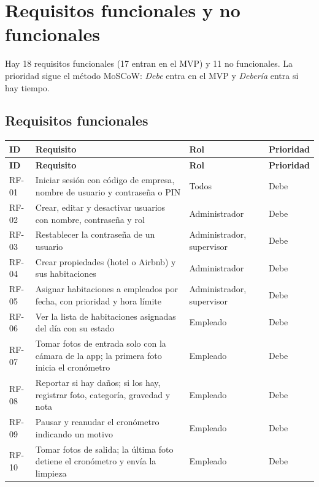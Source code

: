 \documentclass[11pt,a4paper]{article}
\begin{document}
\section{Requisitos funcionales y no funcionales}

Hay 18 requisitos funcionales (17 entran en el MVP) y 11 no funcionales. La prioridad sigue el método MoSCoW: \emph{Debe} entra en el MVP y \emph{Debería} entra si hay tiempo.

\subsection{Requisitos funcionales}

{\small
\begin{longtable}{L{1.2cm} L{8.6cm} L{3.1cm} L{1.7cm}}
\toprule
\textbf{ID} & \textbf{Requisito} & \textbf{Rol} & \textbf{Prioridad}\\
\midrule
\endfirsthead
\toprule
\textbf{ID} & \textbf{Requisito} & \textbf{Rol} & \textbf{Prioridad}\\
\midrule
\endhead
\bottomrule
\endfoot
RF-01 & Iniciar sesión con código de empresa, nombre de usuario y contraseña o PIN & Todos & Debe\\
RF-02 & Crear, editar y desactivar usuarios con nombre, contraseña y rol & Administrador & Debe\\
RF-03 & Restablecer la contraseña de un usuario & Administrador, supervisor & Debe\\
RF-04 & Crear propiedades (hotel o Airbnb) y sus habitaciones & Administrador & Debe\\
RF-05 & Asignar habitaciones a empleados por fecha, con prioridad y hora límite & Administrador, supervisor & Debe\\
RF-06 & Ver la lista de habitaciones asignadas del día con su estado & Empleado & Debe\\
RF-07 & Tomar fotos de entrada solo con la cámara de la app; la primera foto inicia el cronómetro & Empleado & Debe\\
RF-08 & Reportar si hay daños; si los hay, registrar foto, categoría, gravedad y nota & Empleado & Debe\\
RF-09 & Pausar y reanudar el cronómetro indicando un motivo & Empleado & Debe\\
RF-10 & Tomar fotos de salida; la última foto detiene el cronómetro y envía la limpieza & Empleado & Debe\\

\end{longtable}}
\end{document}
